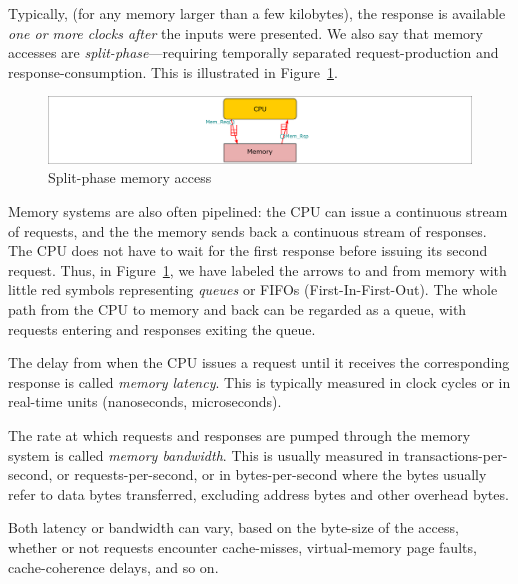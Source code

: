 
Typically, (for any memory larger than a few kilobytes), the response
is available \emph{one or more clocks after} the inputs were
presented.  We also say that memory accesses are
\emph{split-phase}---requiring temporally separated request-production
and response-consumption.  This is illustrated in
Figure~\ref{Fig_BSV_Split_Phase_Mem}.
\begin{figure}[htbp]
  \centerline{\includegraphics[width=6in,angle=0]{Figures/Fig_BSV_Split_Phase_Mem}}
  \caption{\label{Fig_BSV_Split_Phase_Mem} Split-phase memory access}
\end{figure}

Memory systems are also often pipelined: the CPU can issue a
continuous stream of requests, and the the memory sends back a
continuous stream of responses.  The CPU does not have to wait for the
first response before issuing its second request.  Thus, in
Figure~\ref{Fig_BSV_Split_Phase_Mem}, we have labeled the arrows to
and from memory with little red symbols representing \emph{queues} or
FIFOs (First-In-First-Out).  The whole path from the CPU to memory and
back can be regarded as a queue, with requests entering and responses
exiting the queue.


The delay from when the CPU issues a request until it receives the
corresponding response is called \emph{memory latency}.  This is
typically measured in clock cycles or in real-time units (nanoseconds,
microseconds).


The rate at which requests and responses are pumped through the memory
system is called \emph{memory bandwidth}.  This is usually measured in
transactions-per-second, or requests-per-second, or in
bytes-per-second where the bytes usually refer to data bytes
transferred, excluding address bytes and other overhead bytes.

Both latency or bandwidth can vary, based on the byte-size of the
access, whether or not requests encounter cache-misses, virtual-memory
page faults, cache-coherence delays, and so on.

